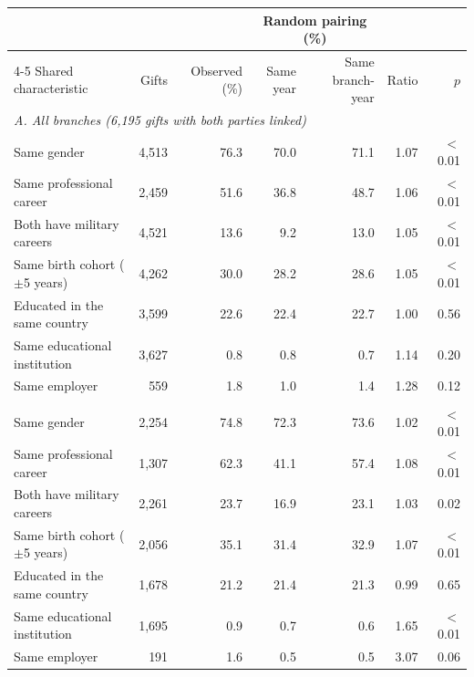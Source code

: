 \begin{tabular}{lrrrrrr}
\toprule
 & & & \multicolumn{2}{c}{Random pairing (\%)} & & \\ \cmidrule(lr){4-5}
Shared characteristic & Gifts & Observed (\%) & Same year & Same branch-year & Ratio & $p$ \\
\midrule
\multicolumn{7}{l}{\emph{A. All branches (6,195 gifts with both parties linked)}} \\
\quad Same gender & 4,513 & 76.3 & 70.0 & 71.1 & 1.07 & $<$0.01 \\
\quad Same professional career & 2,459 & 51.6 & 36.8 & 48.7 & 1.06 & $<$0.01 \\
\quad Both have military careers & 4,521 & 13.6 & 9.2 & 13.0 & 1.05 & $<$0.01 \\
\quad Same birth cohort ($\pm$5 years) & 4,262 & 30.0 & 28.2 & 28.6 & 1.05 & $<$0.01 \\
\quad Educated in the same country & 3,599 & 22.6 & 22.4 & 22.7 & 1.00 & 0.56 \\
\quad Same educational institution & 3,627 & 0.8 & 0.8 & 0.7 & 1.14 & 0.20 \\
\quad Same employer & 559 & 1.8 & 1.0 & 1.4 & 1.28 & 0.12 \\
\addlinespace
\multicolumn{7}{l}{\emph{B. Executive agencies only (2,486 gifts with both parties linked)}} \\
\quad Same gender & 2,254 & 74.8 & 72.3 & 73.6 & 1.02 & $<$0.01 \\
\quad Same professional career & 1,307 & 62.3 & 41.1 & 57.4 & 1.08 & $<$0.01 \\
\quad Both have military careers & 2,261 & 23.7 & 16.9 & 23.1 & 1.03 & 0.02 \\
\quad Same birth cohort ($\pm$5 years) & 2,056 & 35.1 & 31.4 & 32.9 & 1.07 & $<$0.01 \\
\quad Educated in the same country & 1,678 & 21.2 & 21.4 & 21.3 & 0.99 & 0.65 \\
\quad Same educational institution & 1,695 & 0.9 & 0.7 & 0.6 & 1.65 & $<$0.01 \\
\quad Same employer & 191 & 1.6 & 0.5 & 0.5 & 3.07 & 0.06 \\
\bottomrule
\end{tabular}
